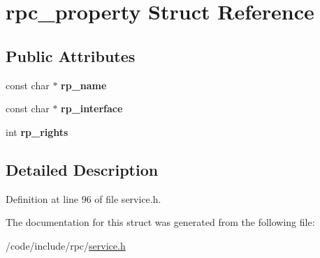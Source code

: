 \hypertarget{structrpc__property}{}\section{rpc\+\_\+property Struct Reference}
\label{structrpc__property}
\subsection*{Public Attributes}
\begin{DoxyCompactItemize}
\item 
const char $\ast$ {\bfseries rp\+\_\+name}\hypertarget{structrpc__property_adeaa00c1da97190f208087c7fa93e88e}{}\label{structrpc__property_adeaa00c1da97190f208087c7fa93e88e}

\item 
const char $\ast$ {\bfseries rp\+\_\+interface}\hypertarget{structrpc__property_a1c36f5b8d28b5a36a9dc6a647244b0fc}{}\label{structrpc__property_a1c36f5b8d28b5a36a9dc6a647244b0fc}

\item 
int {\bfseries rp\+\_\+rights}\hypertarget{structrpc__property_a0c815b5a9960a0824544228d51be90cb}{}\label{structrpc__property_a0c815b5a9960a0824544228d51be90cb}

\end{DoxyCompactItemize}


\subsection{Detailed Description}


Definition at line 96 of file service.\+h.



The documentation for this struct was generated from the following file\+:\begin{DoxyCompactItemize}
\item 
/code/include/rpc/\hyperlink{service_8h}{service.\+h}\end{DoxyCompactItemize}
